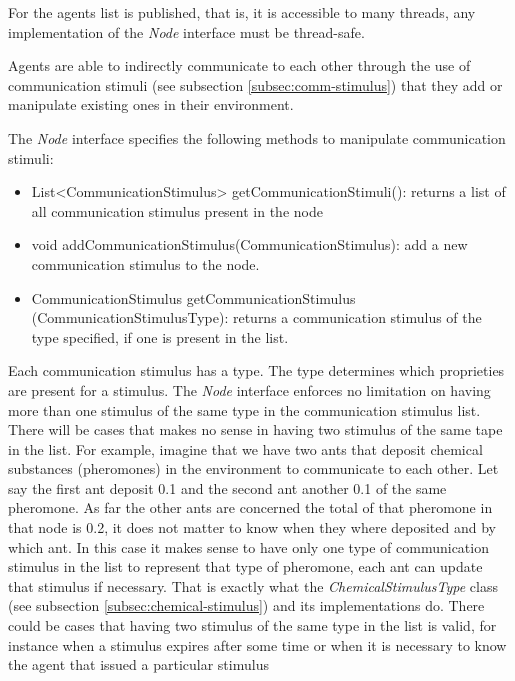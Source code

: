 For the agents list is published, that is, it is accessible to many threads, any implementation of the \emph{Node} interface must be thread-safe.

Agents are able to indirectly communicate to each other through the use of communication stimuli (see subsection \ref{subsec:comm-stimulus}) that they add or manipulate existing ones in their environment.

The \emph{Node} interface specifies the following methods to manipulate communication stimuli:

\begin{itemize}
  \item List<CommunicationStimulus> getCommunicationStimuli(): returns a list of all communication stimulus present in the node
  
  \item void addCommunicationStimulus(CommunicationStimulus): add a new communication stimulus to the node.
  
  \item CommunicationStimulus getCommunicationStimulus (CommunicationStimulusType): returns a communication stimulus of the type specified, if one is present in the list.
\end{itemize}

Each communication stimulus has a type. The type determines which proprieties are present for a stimulus. The \emph{Node} interface enforces no limitation on having more than one stimulus of the same type in the communication stimulus list. There will be cases that makes no sense in having two stimulus of the same tape in the list. For example, imagine that we have two ants that deposit chemical substances (pheromones) in the environment to communicate to each other. Let say the first ant deposit 0.1 and the second ant another 0.1 of the same pheromone. As far the other ants are concerned the total of that pheromone in that node is 0.2, it does not matter to know when they where deposited and by which ant. In this case it makes sense to have only one type of communication stimulus in the list to represent that type of pheromone, each ant can update that stimulus if necessary. That is exactly what the \emph{ChemicalStimulusType} class (see  subsection \ref{subsec:chemical-stimulus}) and its implementations do. There could be cases that having two stimulus of the same type in the list is valid, for instance when a stimulus expires after some time or when it is necessary to know the agent that issued a particular stimulus

